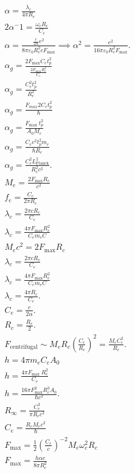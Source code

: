 \begin{gather*}
        \alpha = \frac{\lambda_c}{4 \pi R_c}\\
        2\alpha^-1=\frac{\omega_c R_c}{C_e}\\
        \alpha = \frac{\frac{c}{2 \alpha} e^2}{8 \pi \varepsilon_0 R_c^2 c F_{\text{max}}} \implies \alpha^2 = \frac{e^2}{16 \pi \varepsilon_0 R_c^2 F_{\text{max}}}.\\
        \alpha_g =  \frac{2F_{\text{max}} C_e t_p^2}{\frac{2F_{\text{max}} R_c^2}{C_e}}\\
        \alpha_g =\frac{C_e^2 t_p^2}{R_c^2}\\
        \alpha_g =\frac{F_{max} 2 C_e t_p^2}{\hbar}\\
        \alpha_g=\frac{F_{\text {max }} t_p^2}{A_0 M_e}\\
        \alpha_g = \frac{C_e c^2 t_p^2 m_e}{\hbar R_c}\\
        \alpha_g = \frac{C_e^2 L_{\text{Planck}}^2}{R_c^2 c^2}.\\
        M_e = \frac{2 F_{\text{max}} R_c}{c^2}\\
        f_e = \frac{C_e}{2 \pi R_c}\\
        \lambda_c=\frac{2 \pi c R_c}{C_e}\\
        \lambda_c=\frac{4 \pi F_{\max } R_c^2}{C_e m_e C}\\
        M_e c^2 =2 F_{\max } R_c\\
        \lambda_c=\frac{2 \pi c R_c}{C_e}\\
        \lambda_c =\frac{4 \pi F_{\max } R_c^2}{C_e m_e C}\\
        \lambda_c = \frac{4 \pi R_c}{C_e}.\\
        C_e = \frac{c}{2 \alpha}.\\
        R_c = \frac{R_e}{2}.\\
        F_{\text{centrifugal}} \sim M_e R_c \left(\frac{C_e}{R_c}\right)^2 = \frac{M_e C_e^2}{R_c}.\\
        h=4 \pi m_e C_e A_0\\
        h=\frac{4 \pi F_\text {max } R_e^2}{C_e}\\
        h = \frac{16 \pi F_\text{max}^2 R_c^3 A_0}{\hbar c^2}.\\
        R_\infty = \frac{C_e^3}{\pi R_c c^3}\\
        C_e = \frac{R_c M_e c^2}{\hbar}\\
        F_{\text{max}} = \frac{1}{2} \left( \frac{C_e}{c} \right)^{-2} M_e \omega_c^2 R_c\\
        F_{\text{max}} = \frac{h \alpha c}{8 \pi R_c^2}\\

\end{gather*}
